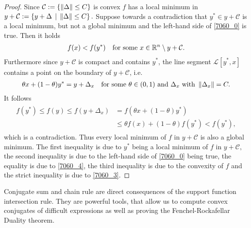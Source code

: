 \begin{proof}
  Since 
  $\mathcal{C}:=\left\{ \left\lVert\Delta\right\rVert\le C \right\}$
  is convex
  $f$ has a local minimum in 
  $
    y + \mathcal{C}
    :=
    \left\{ 
      y + \Delta \,
      \mid \,
      \left\lVert\Delta\right\rVert\le C
    \right\}
    .
  $
  Suppose towards a contradiction that
  $
    y^* \in 
            y + \mathcal{C}
  $
  is a local minimum, but not a global minimum 
  and
  the left-hand side of 
  \eqref{7060_0} is true.
  Then it holds
  \begin{gather}
    \label{7060_3}
    f(x) < f(y^*)
    \quad
    \text{for some}\ 
    x 
    \in 
    \R^n 
    \setminus 
      y + \mathcal{C}
    .
  \end{gather}
  Furthermore since $y + \mathcal{C}$ is compact and contains $y^*$,
  the line segment $\mathcal{L}[y^*,x]$ contains a point on the boundary of 
  $y + \mathcal{C}$, i.e.
  \begin{gather}
    \label{7060_4}
    \theta x + (1 - \theta) y^* = y + \Delta_x
    \quad
    \text{for some}\ 
    \theta \in (0,1)\ 
    \text{and}\ 
    \Delta_x \ 
    \text{with}\ 
    \norm{\Delta_x}=C
    .
  \end{gather}
    It follows
    \begin{align}
      \label{7060_5}
      \begin{split}
      f(y^*)
      \le
      f(y)
      \le
      f(y + \Delta_x)
      &=
      f(
        \theta x + (1 - \theta) y^*
      )
      \\
      &\le
      \theta f(x)
      + 
      (1 - \theta)
      f(y^*)
      <
      f(y^*)
      ,
      \end{split}
    \end{align}
    which is a contradiction.
    Thus every local minimum of $f$ in $y + \mathcal{C}$ is also a global minimum.
    The first inequality is due to
    $y^*$ being a local minimum of $f$ in
    $
      y + \mathcal{C},
    $
    the second inequality is due to the left-hand side of 
    \eqref{7060_0} being true,
    the equality is due to \eqref{7060_4},
    the third inequality is due to the convexity of $f$
    and the strict inequality is due to \eqref{7060_3}.
\end{proof}


\begin{takeaways}
  Conjugate sum and chain rule are direct consequences of the support function intersection rule. They are powerful tools, that allow us to compute convex conjugates of difficult expressions as well as proving the Fenchel-Rockafellar Duality theorem.
\end{takeaways}
